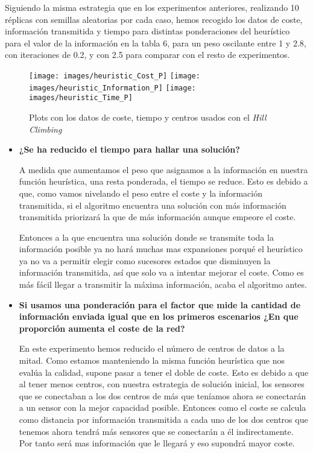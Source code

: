 \documentclass{article}
\begin{document}
\begin{enumerate}
  Siguiendo la misma estrategia que en los experimentos anteriores, realizando 10 réplicas con semillas aleatorias por cada caso, hemos recogido los datos de coste, información transmitida y tiempo para distintas ponderaciones del heurístico para el valor de la información en la tabla 6, para un peso oscilante entre 1 y 2.8, con iteraciones de 0.2, y con 2.5 para comparar con el resto de experimentos.
  \begin{figure}[ht]
    \centering
    \texttt{[image: images/heuristic\_Cost\_P]}\hfill
    \texttt{[image: images/heuristic\_Information\_P]}\hfill
    \texttt{[image: images/heuristic\_Time\_P]}
    \caption{Plots con los datos de coste, tiempo y centros usados con el \textit{Hill Climbing}}
    \label{fig:HP}
  \end{figure}
  \begin{itemize}
    \item \textbf{¿Se ha reducido el tiempo para hallar una solución?}\par
    A medida que aumentamos el peso que asignamos a la información en nuestra función heurística, una resta ponderada, el tiempo se reduce. Esto es debido a que, como vamos nivelando el peso entre el coste y la información transmitida, si el algoritmo encuentra una solución con más información transmitida priorizará la que de más información aunque empeore el coste.\par
    Entonces a la que encuentra una solución donde se transmite toda la información posible ya no hará muchas mas expansiones porqué el heurístico ya no va a permitir elegir como sucesores estados que disminuyen la información transmitida, así que solo va a intentar mejorar el coste. Como es más fácil llegar a transmitir la máxima información, acaba el algoritmo antes.
    \item \textbf{Si usamos una ponderación para el factor que mide la cantidad de información enviada igual que en los primeros escenarios ¿En que proporción aumenta el coste de la red?}\par
    En este experimento hemos reducido el número de centros de datos a la mitad. Como estamos manteniendo la misma función heurística que nos evalúa la calidad, supone pasar a tener el doble de coste. Esto es debido a que al tener menos centros, con nuestra estrategia de solución inicial, los sensores que se conectaban a los dos centros de más que teníamos ahora se conectarán a un sensor con la mejor capacidad posible. Entonces como el coste se calcula como distancia por información transmitida a cada uno de los dos centros que tenemos ahora tendrá más sensores que se conectarán a él indirectamente. Por tanto será mas información que le llegará y eso supondrá mayor coste. \par

\end{itemize}
\end{enumerate}
\end{document}
